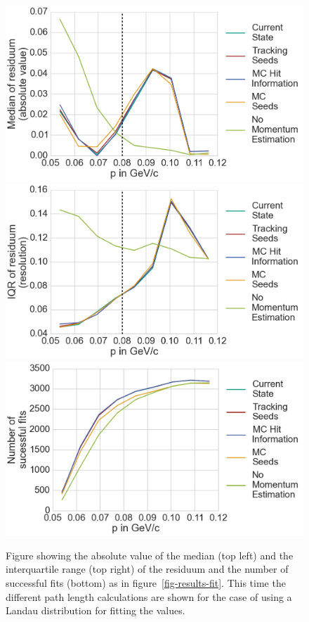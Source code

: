 \begin{figure}
  \centering
  \includegraphics[width=0.48\linewidth]{figures/vxd/landauKalman0_3Median.png}
  \includegraphics[width=0.48\linewidth]{figures/vxd/landauKalman0_3IQR.png}
  \includegraphics[width=0.48\linewidth]{figures/vxd/landauKalman0_3Count.png}
  \caption[Residuum of the momentum estimation for different path length calculations.]{Figure showing the absolute value of the median (top left) and the interquartile range (top right) of the residuum and the number of successful fits (bottom) as in figure~\ref{fig-results-fit}. This time the different path length calculations are shown for the case of using a Landau distribution for fitting the \dedx values.}
  \label{fig-results-fit2}
\end{figure}

